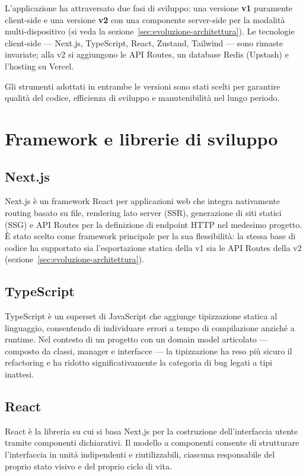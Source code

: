\documentclass[12pt]{report}
\begin{document}
L'applicazione ha attraversato due fasi di sviluppo: una versione \textbf{v1} puramente client-side e una versione \textbf{v2} con una componente server-side per la modalità multi-dispositivo (si veda la sezione~\ref{sec:evoluzione-architettura}). Le tecnologie client-side --- Next.js, TypeScript, React, Zustand, Tailwind --- sono rimaste invariate; alla v2 si aggiungono le API Routes, un database Redis (Upstash) e l'hosting su Vercel.

Gli strumenti adottati in entrambe le versioni sono stati scelti per garantire qualità del codice, efficienza di sviluppo e manutenibilità nel lungo periodo.

\section{Framework e librerie di sviluppo}

\subsection{Next.js}
Next.js è un framework React per applicazioni web che integra nativamente routing basato su file, rendering lato server (SSR), generazione di siti statici (SSG) e API Routes per la definizione di endpoint HTTP nel medesimo progetto.
È stato scelto come framework principale per la sua flessibilità: la stessa base di codice ha supportato sia l'esportazione statica della v1 sia le API Routes della v2 (sezione~\ref{sec:evoluzione-architettura}).

\subsection{TypeScript}
TypeScript è un superset di JavaScript che aggiunge tipizzazione statica al linguaggio, consentendo di individuare errori a tempo di compilazione anziché a runtime.
Nel contesto di un progetto con un domain model articolato --- composto da classi, manager e interfacce --- la tipizzazione ha reso più sicuro il refactoring e ha ridotto significativamente la categoria di bug legati a tipi inattesi.

\subsection{React}
React è la libreria su cui si basa Next.js per la costruzione dell'interfaccia utente tramite componenti dichiarativi.
Il modello a componenti consente di strutturare l'interfaccia in unità indipendenti e riutilizzabili, ciascuna responsabile del proprio stato visivo e del proprio ciclo di vita.
\end{document}
